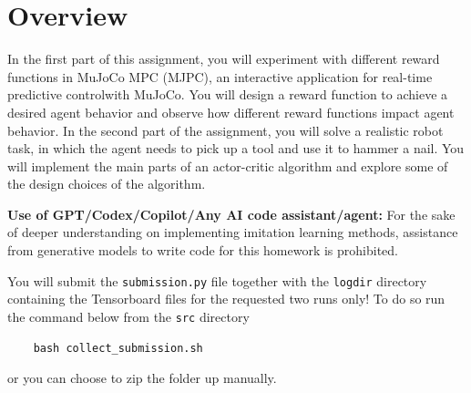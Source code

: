 \section{Overview}

In the first part of this assignment, you will experiment with different reward functions in MuJoCo MPC (MJPC), 
an interactive application for real-time predictive controlwith MuJoCo. You will design a reward function to achieve a desired agent behavior and observe 
how different reward functions impact agent behavior. In the second part of the assignment, you will solve a realistic robot task, 
in which the agent needs to pick up a tool and use it to hammer a nail. You will implement the main parts of an actor-critic algorithm and explore some of the design choices of the algorithm.

\vspace{0.2cm}

\noindent\textbf{Use of GPT/Codex/Copilot/Any AI code assistant/agent:} For the sake of deeper understanding on implementing imitation learning methods, assistance from generative models to write code for this homework is prohibited. 

You will submit the \texttt{submission.py} file together with the \texttt{logdir} directory containing the Tensorboard files for the requested two runs only! To do so run the command  below from the \texttt{src} directory
\begin{verbatim}
    bash collect_submission.sh
\end{verbatim}

or you can choose to zip the folder up manually.

\newpage